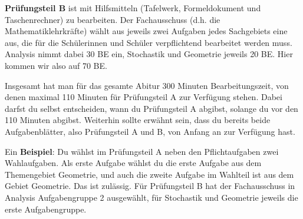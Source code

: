 \documentclass[ngerman, 12pt]{nssheetxea}
\begin{document}
\textbf{Prüfungsteil B} ist mit Hilfsmitteln (Tafelwerk, Formeldokument und Taschenrechner) zu bearbeiten. Der Fachausschuss (d.h. die Mathematiklehrkräfte) wählt aus jeweils zwei Aufgaben jedes Sachgebiets eine aus, die für die Schülerinnen und Schüler verpflichtend bearbeitet werden muss. Analysis nimmt dabei 30 BE ein, Stochastik und Geometrie jeweils 20 BE. Hier kommen wir also auf 70 BE. \par
Insgesamt hat man für das gesamte Abitur 300 Minuten Bearbeitungszeit, von denen maximal 110 Minuten für Prüfungsteil A zur Verfügung stehen. Dabei darfst du selbst entscheiden, wann du Prüfungsteil A abgibst, solange du vor den 110 Minuten abgibst. Weiterhin sollte erwähnt sein, dass du bereits beide Aufgabenblätter, also Prüfungsteil A und B, von Anfang an zur Verfügung hast. \par
Ein \textbf{Beispiel}: Du wählst im Prüfungsteil A neben den Pflichtaufgaben zwei Wahlaufgaben. Als erste Aufgabe wählst du die erste Aufgabe aus dem Themengebiet Geometrie, und auch die zweite Aufgabe im Wahlteil ist aus dem Gebiet Geometrie. Das ist zulässig. Für Prüfungsteil B hat der Fachausschuss in Analysis Aufgabengruppe 2 ausgewählt, für Stochastik und Geometrie jeweils die erste Aufgabengruppe.
\end{document}
